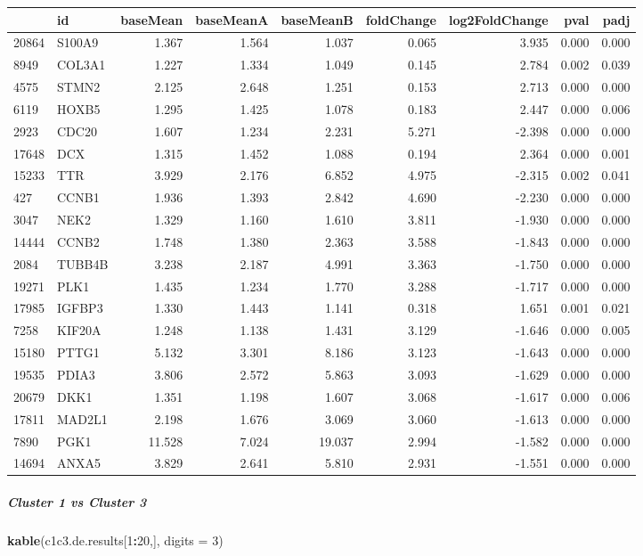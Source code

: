 \documentclass[]{article}
\newenvironment{Shaded}{\begin{snugshade}}{\end{snugshade}}
\newcommand{\DataTypeTok}[1]{\textcolor[rgb]{0.13,0.29,0.53}{#1}}
\newcommand{\DecValTok}[1]{\textcolor[rgb]{0.00,0.00,0.81}{#1}}
\newcommand{\KeywordTok}[1]{\textcolor[rgb]{0.13,0.29,0.53}{\textbf{#1}}}
\newcommand{\NormalTok}[1]{#1}
\newcommand{\OperatorTok}[1]{\textcolor[rgb]{0.81,0.36,0.00}{\textbf{#1}}}
\let\oldsubparagraph\subparagraph
\renewcommand{\subparagraph}[1]{\oldsubparagraph{#1}\mbox{}}
\begin{document}
\begin{longtable}[]{@{}llrrrrrrr@{}}
\toprule
& id & baseMean & baseMeanA & baseMeanB & foldChange & log2FoldChange &
pval & padj\tabularnewline
\midrule
\endhead
20864 & S100A9 & 1.367 & 1.564 & 1.037 & 0.065 & 3.935 & 0.000 &
0.000\tabularnewline
8949 & COL3A1 & 1.227 & 1.334 & 1.049 & 0.145 & 2.784 & 0.002 &
0.039\tabularnewline
4575 & STMN2 & 2.125 & 2.648 & 1.251 & 0.153 & 2.713 & 0.000 &
0.000\tabularnewline
6119 & HOXB5 & 1.295 & 1.425 & 1.078 & 0.183 & 2.447 & 0.000 &
0.006\tabularnewline
2923 & CDC20 & 1.607 & 1.234 & 2.231 & 5.271 & -2.398 & 0.000 &
0.000\tabularnewline
17648 & DCX & 1.315 & 1.452 & 1.088 & 0.194 & 2.364 & 0.000 &
0.001\tabularnewline
15233 & TTR & 3.929 & 2.176 & 6.852 & 4.975 & -2.315 & 0.002 &
0.041\tabularnewline
427 & CCNB1 & 1.936 & 1.393 & 2.842 & 4.690 & -2.230 & 0.000 &
0.000\tabularnewline
3047 & NEK2 & 1.329 & 1.160 & 1.610 & 3.811 & -1.930 & 0.000 &
0.000\tabularnewline
14444 & CCNB2 & 1.748 & 1.380 & 2.363 & 3.588 & -1.843 & 0.000 &
0.000\tabularnewline
2084 & TUBB4B & 3.238 & 2.187 & 4.991 & 3.363 & -1.750 & 0.000 &
0.000\tabularnewline
19271 & PLK1 & 1.435 & 1.234 & 1.770 & 3.288 & -1.717 & 0.000 &
0.000\tabularnewline
17985 & IGFBP3 & 1.330 & 1.443 & 1.141 & 0.318 & 1.651 & 0.001 &
0.021\tabularnewline
7258 & KIF20A & 1.248 & 1.138 & 1.431 & 3.129 & -1.646 & 0.000 &
0.005\tabularnewline
15180 & PTTG1 & 5.132 & 3.301 & 8.186 & 3.123 & -1.643 & 0.000 &
0.000\tabularnewline
19535 & PDIA3 & 3.806 & 2.572 & 5.863 & 3.093 & -1.629 & 0.000 &
0.000\tabularnewline
20679 & DKK1 & 1.351 & 1.198 & 1.607 & 3.068 & -1.617 & 0.000 &
0.006\tabularnewline
17811 & MAD2L1 & 2.198 & 1.676 & 3.069 & 3.060 & -1.613 & 0.000 &
0.000\tabularnewline
7890 & PGK1 & 11.528 & 7.024 & 19.037 & 2.994 & -1.582 & 0.000 &
0.000\tabularnewline
14694 & ANXA5 & 3.829 & 2.641 & 5.810 & 2.931 & -1.551 & 0.000 &
0.000\tabularnewline
\bottomrule
\end{longtable}

\hypertarget{cluster-1-vs-cluster-3}{%
\subparagraph{Cluster 1 vs Cluster 3}\label{cluster-1-vs-cluster-3}}

\begin{Shaded}
\begin{Highlighting}[]
\KeywordTok{kable}\NormalTok{(c1c3.de.results[}\DecValTok{1}\OperatorTok{:}\DecValTok{20}\NormalTok{,], }\DataTypeTok{digits =} \DecValTok{3}\NormalTok{)}
\end{Highlighting}
\end{Shaded}
\end{document}

